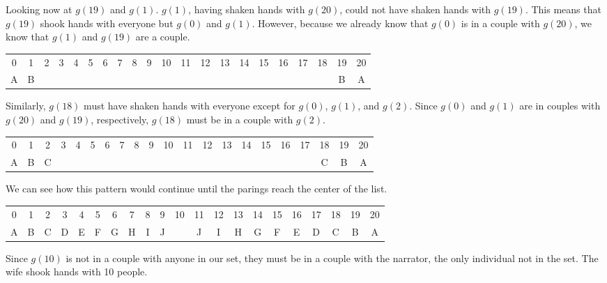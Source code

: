 \documentclass[12pt]{article}
\begin{document}
Looking now at $g(19)$ and $g(1)$. $g(1)$, having shaken hands with $g(20)$, could not have shaken hands with $g(19)$. This means that $g(19)$ shook hands with everyone but $g(0)$ and $g(1)$. However, because we already know that $g(0)$ is in a couple with $g(20)$, we know that $g(1)$ and $g(19)$ are a couple.
\begin{center}
    \begin{tabular}{|c|c|c|c|c|c|c|c|c|c|c|c|c|c|c|c|c|c|c|c|c|}
        \hline
        0 & 1 & 2 & 3 & 4 & 5 & 6 & 7 & 8 & 9 & 10 & 11 & 12 & 13 & 14 & 15 & 16 & 17 & 18 & 19 & 20 \\
        A & B &  &  &  &  &  &  &  &  &  &  &  &  &  &  &  &  &  & B & A \\
        \hline
    \end{tabular}
\end{center}

Similarly, $g(18)$ must have shaken hands with everyone except for $g(0)$, $g(1)$, and $g(2)$. Since $g(0)$ and $g(1)$ are in couples with $g(20)$ and $g(19)$, respectively, $g(18)$ must be in a couple with $g(2)$.
\begin{center}
    \begin{tabular}{|c|c|c|c|c|c|c|c|c|c|c|c|c|c|c|c|c|c|c|c|c|}
        \hline
        0 & 1 & 2 & 3 & 4 & 5 & 6 & 7 & 8 & 9 & 10 & 11 & 12 & 13 & 14 & 15 & 16 & 17 & 18 & 19 & 20 \\
        A & B & C &  &  &  &  &  &  &  &  &  &  &  &  &  &  &  & C & B & A \\
        \hline
    \end{tabular}
\end{center}

We can see how this pattern would continue until the parings reach the center of the list.
\begin{center}
    \begin{tabular}{|c|c|c|c|c|c|c|c|c|c|c|c|c|c|c|c|c|c|c|c|c|}
        \hline
        0 & 1 & 2 & 3 & 4 & 5 & 6 & 7 & 8 & 9 & 10 & 11 & 12 & 13 & 14 & 15 & 16 & 17 & 18 & 19 & 20 \\
        A & B & C & D & E & F & G & H & I & J &  & J & I & H & G & F & E & D & C & B & A \\
        \hline
    \end{tabular}
\end{center}

Since $g(10)$ is not in a couple with anyone in our set, they must be in a couple with the narrator, the only individual not in the set. The wife shook hands with 10 people.
 
\end{document}
